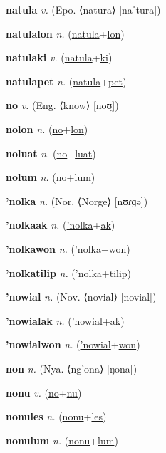 \textbf{\hypertarget{natula}{natula}} \textit{v.} (Epo. ⟨natura⟩ [naˈtura])


\textbf{\hypertarget{natulalon}{natulalon}} \textit{n.} (\hyperlink{natula}{natula}+\allowbreak \hyperlink{lon}{lon})


\textbf{\hypertarget{natulaki}{natulaki}} \textit{v.} (\hyperlink{natula}{natula}+\allowbreak \hyperlink{ki}{ki})


\textbf{\hypertarget{natulapet}{natulapet}} \textit{n.} (\hyperlink{natula}{natula}+\allowbreak \hyperlink{pet}{pet})


\textbf{\hypertarget{no}{no}} \textit{v.} (Eng. ⟨know⟩ [noʊ̯])


\textbf{\hypertarget{nolon}{nolon}} \textit{n.} (\hyperlink{no}{no}+\allowbreak \hyperlink{lon}{lon})


\textbf{\hypertarget{noluat}{noluat}} \textit{n.} (\hyperlink{no}{no}+\allowbreak \hyperlink{luat}{luat})


\textbf{\hypertarget{nolum}{nolum}} \textit{n.} (\hyperlink{no}{no}+\allowbreak \hyperlink{lum}{lum})


\textbf{\hypertarget{'nolka}{'nolka}} \textit{n.} (Nor. ⟨Norge⟩ [nʊɾɡə])


\textbf{\hypertarget{'nolkaak}{'nolkaak}} \textit{n.} (\hyperlink{'nolka}{'nolka}+\allowbreak \hyperlink{ak}{ak})


\textbf{\hypertarget{'nolkawon}{'nolkawon}} \textit{n.} (\hyperlink{'nolka}{'nolka}+\allowbreak \hyperlink{won}{won})


\textbf{\hypertarget{'nolkatilip}{'nolkatilip}} \textit{n.} (\hyperlink{'nolka}{'nolka}+\allowbreak \hyperlink{tilip}{tilip})


\textbf{\hypertarget{'nowial}{'nowial}} \textit{n.} (Nov. ⟨novial⟩ [novial])


\textbf{\hypertarget{'nowialak}{'nowialak}} \textit{n.} (\hyperlink{'nowial}{'nowial}+\allowbreak \hyperlink{ak}{ak})


\textbf{\hypertarget{'nowialwon}{'nowialwon}} \textit{n.} (\hyperlink{'nowial}{'nowial}+\allowbreak \hyperlink{won}{won})


\textbf{\hypertarget{non}{non}} \textit{n.} (Nya. ⟨ng’ona⟩ [ŋona])


\textbf{\hypertarget{nonu}{nonu}} \textit{v.} (\hyperlink{no}{no}+\allowbreak \hyperlink{nu}{nu})


\textbf{\hypertarget{nonules}{nonules}} \textit{n.} (\hyperlink{nonu}{nonu}+\allowbreak \hyperlink{les}{les})


\textbf{\hypertarget{nonulum}{nonulum}} \textit{n.} (\hyperlink{nonu}{nonu}+\allowbreak \hyperlink{lum}{lum})


